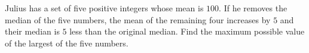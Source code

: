 Julius has a set of five positive integers whose mean is $100$. If he removes the median of the five numbers, the mean of the remaining four increases by $5$ and their median is $5$ less than the original median. Find the maximum possible value of the largest of the five numbers.

